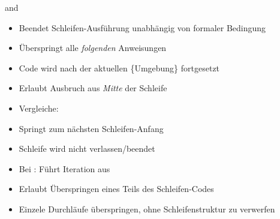 
\begin{frame}[fragile]{ and }
%
\begin{tcbraster}[raster columns=2,
                  raster equal height,
                  nobeforeafter,
                  raster column skip=0.2cm]
\begin{tcolorbox}[title=\texttt{break}]
\begin{itemize}
\item Beendet Schleifen-Ausführung unabhängig von formaler Bedingung
\item Überspringt alle \emph{folgenden} Anweisungen
\item Code wird nach der aktuellen \{Umgebung\} fortgesetzt
\item[\Thus] Erlaubt Ausbruch aus \emph{Mitte} der Schleife
\item Vergleiche: 
\end{itemize}
\end{tcolorbox}
%
\begin{tcolorbox}[title=\texttt{continue}]
\begin{itemize}
\item Springt zum nächsten Schleifen-Anfang
\item Schleife wird nicht verlassen/beendet
\item Bei : Führt Iteration aus
\item[\Thus] Erlaubt Überspringen eines Teils des Schleifen-Codes
\item Einzele Durchläufe überspringen, ohne Schleifenstruktur zu verwerfen
\end{itemize}
\end{tcolorbox}
\end{tcbraster}
%
\end{frame}


